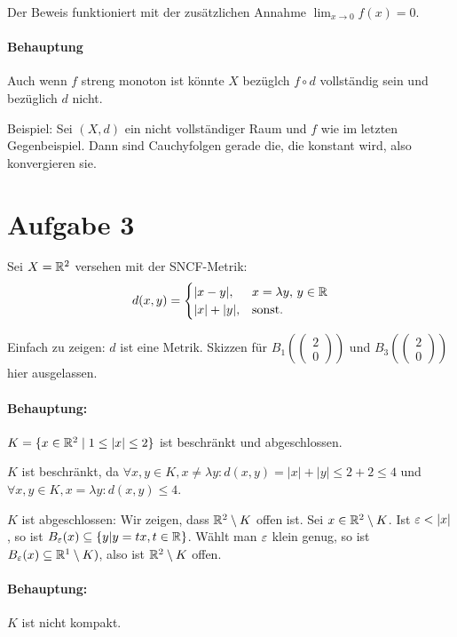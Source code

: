 \documentclass{article}
\begin{document}
Der Beweis funktioniert mit der zusätzlichen Annahme $\lim_{x\to 0} f(x) = 0$.

\paragraph{Behauptung} Auch wenn $f$ streng monoton ist könnte $X$ bezüglch $f\circ d$ vollständig sein und bezüglich $d$ nicht.

Beispiel: Sei $(X,d)$ ein nicht vollständiger Raum und $f$ wie im letzten Gegenbeispiel. Dann sind Cauchyfolgen gerade die, die konstant wird, also konvergieren sie.

\section*{Aufgabe 3}

Sei $X=\mathbb{R}^2$ versehen mit der SNCF-Metrik:
\[
d(x,y) =
\begin{cases}
|x-y|, &x = \lambda y,\, y\in \mathbb{R} \\
|x|+|y|, &\text{sonst.}
\end{cases}
\]

Einfach zu zeigen: $d$ ist eine Metrik. Skizzen für $B_1( (\begin{smallmatrix} 2 \\0 \end{smallmatrix}) )$ und $B_3( (\begin{smallmatrix} 2 \\0 \end{smallmatrix}) )$ hier ausgelassen.

\paragraph{Behauptung:} $K = \{x\in \mathbb{R}^2 \mid 1\le |x|\le 2\}$ ist beschränkt und abgeschlossen.

$K$ ist beschränkt, da $\forall x,y\in K, x\ne \lambda y: d(x,y) = |x|+|y| \le 2+2 \le 4$ und $\forall x,y\in K, x=\lambda y : d(x,y) \le 4$.

$K$ ist abgeschlossen: Wir zeigen, dass $\mathbb{R}^2\setminus K$ offen ist. Sei $x\in \mathbb{R}^2\setminus K$. Ist $\varepsilon < |x|$, so ist $B_\varepsilon(x) \subseteq \{y | y = tx, t\in \mathbb{R}\}$. Wählt man $\varepsilon$ klein genug, so ist $B_\varepsilon (x) \subseteq \mathbb{R}^1\setminus K)$, also ist $\mathbb{R}^2\setminus K$ offen.

\paragraph{Behauptung:} $K$ ist nicht kompakt.
\end{document}
